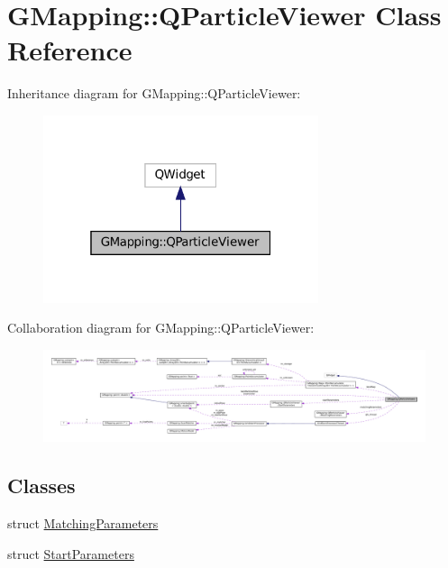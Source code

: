 \hypertarget{classGMapping_1_1QParticleViewer}{}\section{G\+Mapping\+:\+:Q\+Particle\+Viewer Class Reference}
\label{classGMapping_1_1QParticleViewer}


Inheritance diagram for G\+Mapping\+:\+:Q\+Particle\+Viewer\+:
\nopagebreak
\begin{figure}[H]
\begin{center}
\leavevmode
\includegraphics[width=229pt]{classGMapping_1_1QParticleViewer__inherit__graph}
\end{center}
\end{figure}


Collaboration diagram for G\+Mapping\+:\+:Q\+Particle\+Viewer\+:
\nopagebreak
\begin{figure}[H]
\begin{center}
\leavevmode
\includegraphics[width=350pt]{classGMapping_1_1QParticleViewer__coll__graph}
\end{center}
\end{figure}
\subsection*{Classes}
\begin{DoxyCompactItemize}
\item 
struct \hyperlink{structGMapping_1_1QParticleViewer_1_1MatchingParameters}{Matching\+Parameters}
\item 
struct \hyperlink{structGMapping_1_1QParticleViewer_1_1StartParameters}{Start\+Parameters}
\end{DoxyCompactItemize}
